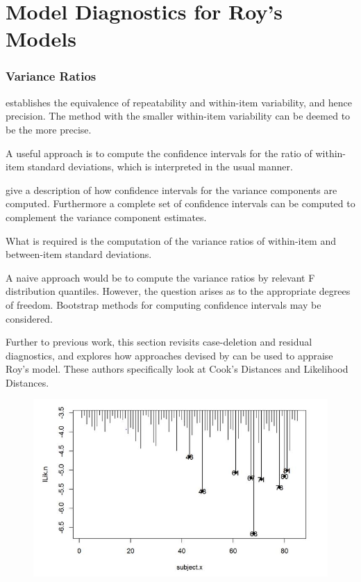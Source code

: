 \documentclass[12pt, a4paper]{report}
\theoremstyle{definition}
\theoremstyle{remark}
\begin{document}
\section{Model Diagnostics for Roy's Models}


\subsubsection{Variance Ratios}
\citet{ARoy2009} establishes the equivalence of repeatability and within-item variability, and hence precision.  The method with the smaller within-item variability can be deemed to be the more precise.

A useful approach is to compute the confidence intervals for the ratio of within-item standard deviations, which is interpreted in the usual manner.
%

\citet[pg 93-95]{PB} give a description of how confidence intervals for the variance components are computed. Furthermore a complete set of confidence intervals can be computed to complement the variance component estimates.

What is required is the computation of the variance ratios of within-item and between-item standard deviations.

A naive approach would be to compute the variance ratios by relevant F distribution quantiles. However, the question arises as to the appropriate degrees of freedom.
Bootstrap methods for computing confidence intervals may be considered.

Further to previous work, this section revisits case-deletion and residual diagnostics, and explores how approaches devised by \citet{Galecki} can be used to appraise Roy's model. These authors specifically look at Cook's Distances and Likelihood Distances.
%


\begin{figure}[h!]
\centering
\includegraphics[width=0.9\linewidth]{images/LogLik-JS-Roy}
\caption{}
\label{fig:LogLik-JS-Roy}
\end{figure}
\end{document}
